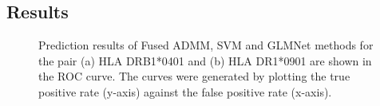 \documentclass[conference,10pt,draftclsnofoot,onecolumn]{IEEEtran}
\begin{document}
\subsection{Results}
\label{subsec:results}
\begin{figure}
    \centering
    \caption{Prediction results of Fused ADMM, SVM and GLMNet methods for the pair (a) HLA DRB1*0401 and (b) HLA DR1*0901 are shown in the ROC curve. The curves were generated by plotting the true positive rate (y-axis) against the false positive rate (x-axis).}
    \label{fig:roc}
\end{figure}
\end{document}
